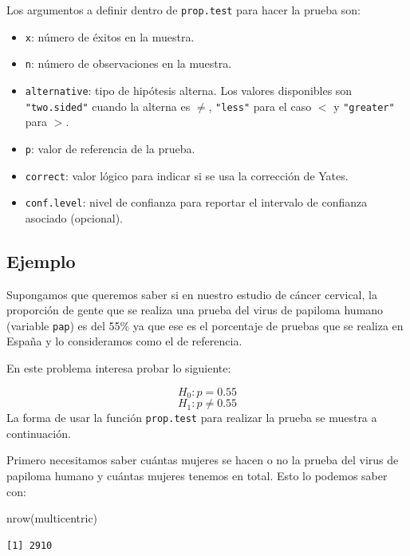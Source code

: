 \documentclass[
]{book}
\newenvironment{Shaded}{\begin{snugshade}}{\end{snugshade}}
\newcommand{\FunctionTok}[1]{\textcolor[rgb]{0.00,0.00,0.00}{#1}}
\newcommand{\NormalTok}[1]{#1}
\providecommand{\tightlist}{%
  \setlength{\itemsep}{0pt}\setlength{\parskip}{0pt}}
\begin{document}
Los argumentos a definir dentro de \texttt{prop.test} para hacer la prueba son:

\begin{itemize}
\tightlist
\item
  \texttt{x}: número de éxitos en la muestra.
\item
  \texttt{n}: número de observaciones en la muestra.
\item
  \texttt{alternative}: tipo de hipótesis alterna. Los valores disponibles son \texttt{"two.sided"} cuando la alterna es \(\neq\), \texttt{"less"} para el caso \(<\) y \texttt{"greater"} para \(>\).
\item
  \texttt{p}: valor de referencia de la prueba.
\item
  \texttt{correct}: valor lógico para indicar si se usa la corrección de Yates.
\item
  \texttt{conf.level}: nivel de confianza para reportar el intervalo de confianza asociado (opcional).
\end{itemize}

\hypertarget{ejemplo-1}{%
\subsection*{Ejemplo}\label{ejemplo-1}}

Supongamos que queremos saber si en nuestro estudio de cáncer cervical, la proporción de gente que se realiza una prueba del virus de papiloma humano (variable \texttt{pap}) es del 55\% ya que ese es el porcentaje de pruebas que se realiza en España y lo consideramos como el de referencia.

En este problema interesa probar lo siguiente:

\[H_0: p = 0.55\]
\[H_1: p \ne 0.55\]
La forma de usar la función \texttt{prop.test} para realizar la prueba se muestra a continuación.

Primero necesitamos saber cuántas mujeres se hacen o no la prueba del virus de papiloma humano y cuántas mujeres tenemos en total. Esto lo podemos saber con:

\begin{Shaded}
\begin{Highlighting}[]
\FunctionTok{nrow}\NormalTok{(multicentric)}
\end{Highlighting}
\end{Shaded}

\begin{verbatim}
[1] 2910
\end{verbatim}
\end{document}
